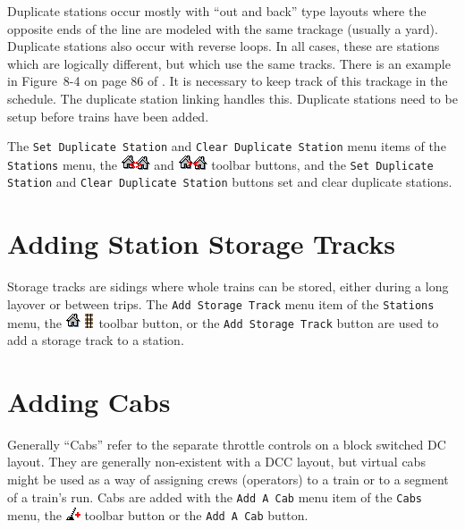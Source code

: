 Duplicate stations occur mostly with ``out and back'' type layouts
where the opposite ends of the line are modeled with the same trackage
(usually a yard).  Duplicate stations also occur with reverse loops. In
all cases, these are stations which are logically different, but which
use the same tracks. There is an example in Figure~8-4 on page 86 of
\cite{Chubb77}. It is necessary to keep track of this trackage in the
schedule.  The duplicate station linking handles this. Duplicate
stations need to be setup before trains have been added.

The \texttt{Set Duplicate Station} and 
\texttt{Clear Duplicate Station} menu items of the \texttt{Stations} menu, the
\includegraphics{TTsetdupstation.png} and
\includegraphics{TTcleardupstation.png} toolbar buttons, and the
\texttt{Set Duplicate Station} and \texttt{Clear Duplicate Station} buttons
set and clear duplicate stations.

\section{Adding Station Storage Tracks}

Storage tracks are sidings where whole trains can be stored, either
during a long layover or between trips. The  \texttt{Add Storage Track}
menu item of the \texttt{Stations} menu, the
\includegraphics{TTaddstorage.png} toolbar button, or the  \texttt{Add
Storage Track} button are used to add a storage track to a station.

\section{Adding Cabs}

Generally ``Cabs'' refer to the separate throttle controls on a block
switched DC layout.  They are generally non-existent with a DCC layout,
but virtual cabs might be used as a way of assigning crews (operators)
to a train or to a segment of a train's run.  Cabs are added with the
\texttt{Add A Cab} menu item of the \texttt{Cabs} menu, the
\includegraphics{TTaddcab.png} toolbar button or the \texttt{Add A Cab}
button.

